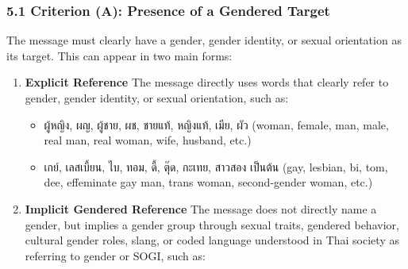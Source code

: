 \documentclass[12pt,oneside,openright,a4paper]{cpe-english-project}
\begin{document}
\subsubsection{5.1 Criterion (A): Presence of a Gendered Target}\label{criterion-a-presence-of-a-gendered-target}

The message must clearly have a gender, gender identity, or sexual
orientation as its target. This can appear in two main forms:

\begin{enumerate}
\setlength{\itemsep}{0.15\baselineskip}
\setlength{\parsep}{0pt}
\setlength{\parskip}{0pt}
\def\labelenumi{\arabic{enumi}.}
\item
  \textbf{Explicit Reference}
  The message directly uses words that clearly refer to gender, gender
  identity, or sexual orientation, such as:

  \begin{itemize}
\setlength{\itemsep}{0.15\baselineskip}
\setlength{\parsep}{0pt}
\setlength{\parskip}{0pt}
    \item
    ผู้หญิง, ผญ, ผู้ชาย, ผช, ชายแท้, หญิงแท้, เมีย, ผัว
    (woman, female, man, male, real man, real woman, wife, husband,
    etc.)
  \item
    เกย์, เลสเบี้ยน, ไบ, ทอม, ดี้, ตุ๊ด, กะเทย, สาวสอง เป็นต้น
    (gay, lesbian, bi, tom, dee, effeminate gay man, trans woman,
    second-gender woman, etc.)
  \end{itemize}
\item
  \textbf{Implicit Gendered Reference}
  The message does not directly name a gender, but implies a gender
  group through sexual traits, gendered behavior, cultural gender roles,
  slang, or coded language understood in Thai society as referring to
  gender or SOGI, such as:
\end{enumerate}
\end{document}
